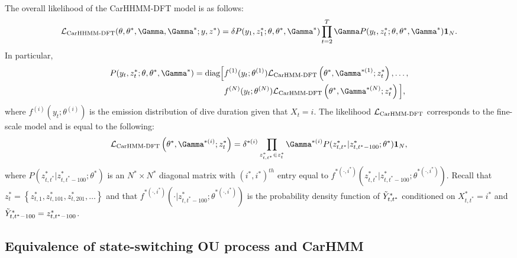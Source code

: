 The overall likelihood of the CarHHMM-DFT model is as follows:
%
$$\calL_{\text{CarHHMM-DFT}}(\theta,\theta^*,\Gamma,\Gamma^*;y,z^*) = \delta P(y_1,z_1^*;\theta,\theta^*,\Gamma^*) \prod_{t=2}^T \Gamma P(y_t,z_t^*;\theta,\theta^*,\Gamma^*) \mathbf{1}_N.$$
%
In particular,
%
\begin{align*}
P(y_t,z_t^*;\theta,\theta^*,\Gamma^*)  = \text{diag}\Big[&f^{(1)}(y_t;\theta^{(1)})\calL_{\text{CarHMM-DFT}}\left(\theta^*,\Gamma^{*(1)};z_t^*\right), \ldots , \\
&f^{(N)}(y_t;\theta^{(N)})\calL_{\text{CarHMM-DFT}}\left(\theta^*,\Gamma^{*(N)};z_t^*\right) \Big],
\end{align*}
%
where $f^{(i)}(y_t;\theta^{(i)})$ is the emission distribution of dive duration given that $X_t = i$. The likelihood $\mathcal{L}_{\text{CarHMM-DFT}}$ corresponds to the fine-scale model and is equal to the following:
%
$$\calL_{\text{CarHMM-DFT}}\left(\theta^{*},\Gamma^{*(i)};z_t^*\right) = \delta^{*(i)} \prod_{z^*_{t,t^*} \in z^*_t} \Gamma^{*(i)} P(z^*_{t,t^*}|z^*_{t,t^*-100};\theta^*) \mathbf{1}_N,$$
%
where $P(z^*_{t,t^*}|z^*_{t,t^*-100};\theta^*)$ is an $N^* \times N^*$ diagonal matrix with $(i^*,i^*)^{th}$ entry equal to $f^{*(\cdot,i^*)}(z^*_{t,t^*}|z^*_{t,t^*-100}; \theta^{*(\cdot,i^*)})$.
%
Recall that $z^*_t = \left\{z^*_{t,1},z^*_{t,101},z^*_{t,201},\ldots\right\}$ and that $f^{*(\cdot,i^*)}(\cdot|z^*_{t,t^*-100}; \theta^{*(\cdot,i^*)})$ is the probability density function of $\tilde{Y}^*_{t,t^*}$ conditioned on $X^*_{t,t^*} = i^*$ and $\tilde{Y}^*_{t,t^*-100} = z^*_{t,t^*-100}$.


\iffalse

\subsection{Equivalence of state-switching OU process and CarHMM}

